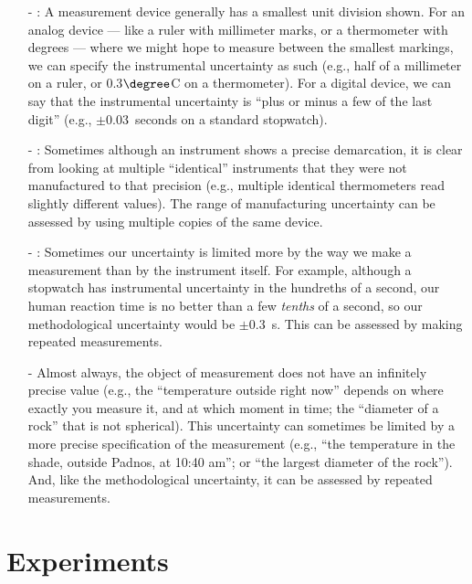 	\begin{itemize}
	\item[-] : A measurement device generally has a smallest unit division shown. For an analog device --- like a ruler with millimeter marks, or a thermometer with degrees --- where we might hope to measure between the smallest markings, we can specify the instrumental uncertainty as such (e.g., half of a millimeter on a ruler, or 0.3$\degree$C on a thermometer).  For a digital device, we can say that the instrumental uncertainty is ``plus or minus a few of the last digit'' (e.g., $\pm 0.03$~seconds on a standard stopwatch).  
	\item[-]  : Sometimes although an instrument shows a precise demarcation, it is clear from looking at multiple ``identical'' instruments that they were not manufactured to that precision (e.g., multiple identical thermometers read slightly different values).  The range of manufacturing uncertainty can be assessed by using multiple copies of the same device.
	\item[-] : Sometimes our uncertainty is limited more by the way we make a measurement than by the instrument itself.  For example, although a stopwatch has instrumental uncertainty in the hundreths of a second, our human reaction time is no better than a few {\em tenths} of a second, so our methodological uncertainty would be $\pm0.3$~s.  This can be assessed by making repeated measurements.
	\item[-]  Almost always, the object of measurement does not have an infinitely precise value (e.g., the ``temperature outside right now'' depends on where exactly you measure it, and at which moment in time; the ``diameter of a rock'' that is not spherical).  This uncertainty can sometimes be limited by a more precise specification of the measurement (e.g., ``the temperature in the shade, outside Padnos, at 10:40 am''; or ``the largest diameter of the rock'').  And, like the methodological uncertainty, it can be assessed by repeated measurements.
	\end{itemize}
	
	
\section{Experiments}

